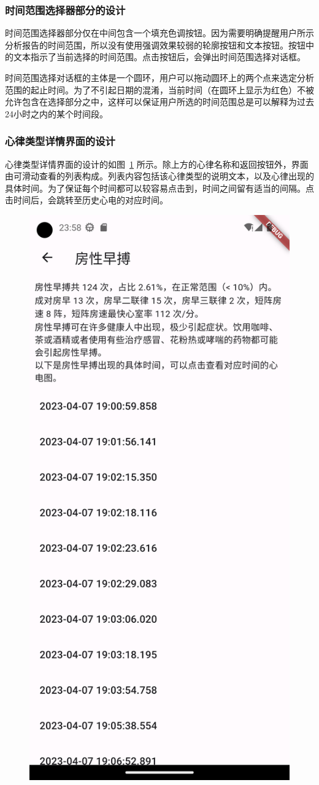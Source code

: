 \subsubsection{时间范围选择器部分的设计}\label{subsubsec:analytics-time-range-design}

时间范围选择器部分仅在中间包含一个填充色调按钮。因为需要明确提醒用户所示分析报告的时间范围，所以没有使用强调效果较弱的轮廓按钮和文本按钮。按钮中的文本指示了当前选择的时间范围。点击按钮后，会弹出时间范围选择对话框。

时间范围选择对话框的主体是一个圆环，用户可以拖动圆环上的两个点来选定分析范围的起止时间。为了不引起日期的混淆，当前时间（在圆环上显示为红色）不被允许包含在选择部分之中，这样可以保证用户所选的时间范围总是可以解释为过去24小时之内的某个时间段。

\subsubsection{心律类型详情界面的设计}\label{subsubsec:label-details}

心律类型详情界面的设计的如图~\ref{fig:label-details} 所示。除上方的心律名称和返回按钮外，界面由可滑动查看的列表构成。列表内容包括该心律类型的说明文本，以及心律出现的具体时间。为了保证每个时间都可以较容易点击到，时间之间留有适当的间隔。点击时间后，会跳转至历史心电的对应时间。

\begin{figure}[ht]
    \centering
    \includegraphics[width=.33\textwidth]{../assets/label-details}
    \label{fig:label-details}
\end{figure}

